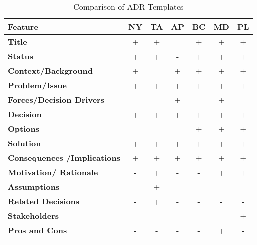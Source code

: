 \begin{longtable}{|m{5cm}|c|c|c|c|c|c|}
    \hline
    \textbf{Feature} & \textbf{NY} & \textbf{TA} & \textbf{AP} & \textbf{BC} & \textbf{MD} & \textbf{PL} \\
    \hline
    \textbf{Title} & + & + & - & + & + & + \\
    \hline
    \textbf{Status} & + & + & - & + & + & + \\
    \hline
    \textbf{Context/Background} & + & - & + & + & + & + \\
    \hline
    \textbf{Problem/Issue} & + & + & + & + & + & + \\
    \hline
    \textbf{Forces/Decision Drivers} & - & - & + & - & + & - \\
    \hline
    \textbf{Decision} & + & + & + & + & + & + \\
    \hline
    \textbf{Options} & - & - & - & + & + & + \\
    \hline
    \textbf{Solution} & + & + & + & + & + & + \\
    \hline
    \textbf{Consequences
    /Implications} & + & + & + & + & + & + \\
    \hline
    \textbf{Motivation/
    Rationale} & - & + & - & - & + & + \\
    \hline
    \textbf{Assumptions} & - & + & - & - & - & - \\
    \hline
    \textbf{Related Decisions} & - & + & - & - & - & - \\
    \hline
    \textbf{Stakeholders} & - & - & - & - & - & + \\
    \hline
    \textbf{Pros and Cons} & - & - & - & - & + & - \\
    \hline
    \caption{Comparison of ADR Templates}
    \label{table:adr_template_comparison}
\end{longtable}